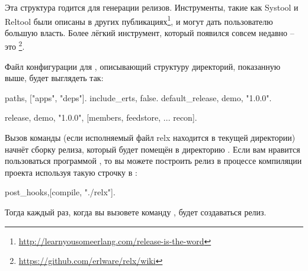 \documentclass[11pt, oneside]{book}   	%
\begin{document}
Эта структура годится для генерации релизов. Инструменты, такие как Systool и Reltool были описаны в других публикациях\footnote{\href{http://learnyousomeerlang.com/release-is-the-word}{http://learnyousomeerlang.com/release-is-the-word}}, и могут дать пользователю большую власть. Более лёгкий инструмент, который появился совсем недавно -- это \footnote{\href{https://github.com/erlware/relx/wiki}{https://github.com/erlware/relx/wiki}}.

Файл конфигурации для , описывающий структуру директорий, показанную выше, будет выглядеть так:

\begin{VerbatimText}
{paths, ["apps", "deps"]}.
{include_erts, false}. %
{default_release, demo, "1.0.0"}.

{release, {demo, "1.0.0"},
    [members,
     feedstore,
     ...
     recon]}.
\end{VerbatimText}

Вызов команды  (если исполняемый файл relx находится в текущей директории) начнёт сборку релиза, который будет помещён в директорию . Если вам нравится пользоваться программой , то вы можете построить релиз в процессе компиляции проекта используя такую строчку в :

\begin{VerbatimText}
{post_hooks,[{compile, "./relx"}]}.
\end{VerbatimText}

Тогда каждый раз, когда вы вызовете команду , будет создаваться релиз.
\end{document}
